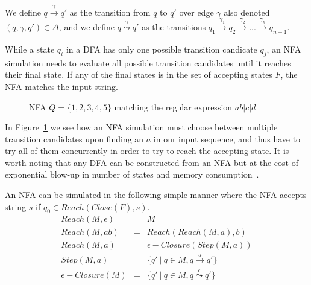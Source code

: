 \documentclass[12pt]{article}
\theoremstyle{definition}
\begin{document}
We define $q \xrightarrow{\gamma} q'$ as the transition from $q$ to $q'$ over edge $\gamma$ also denoted $(q, \gamma, q') \in \Delta$, and we define $q \overset{\gamma}{\leadsto} q'$ as the transitions $q_1 \xrightarrow{\gamma_1} q_{2} \xrightarrow{\gamma_{2}} ... \xrightarrow{\gamma_{n}} q_{n+1}$.

While a state $q_i$ in a DFA has only one possible transition candicate $q_j$, an NFA simulation needs to evaluate all possible transition candidates until it reaches their final state. If any of the final states is in the set of accepting states $F$, the NFA matches the input string.

\begin{figure}[H]
  \begin{center}

	
	\caption{NFA $Q = \{1, 2, 3, 4, 5\}$ matching the regular expression \underline{$ab|c|d$}}
	\label{nfa_simple}
  \end{center}
\end{figure}

In Figure~\ref{nfa_simple} we see how an NFA simulation must choose between multiple transition candidates upon finding an $a$ in our input sequence, and thus have to try all of them concurrently in order to try to reach the accepting state. It is worth noting that any DFA can be constructed from an NFA but at the cost of exponential blow-up in number of states and memory consumption~\cite{nfa-to-dfa}.

An NFA can be simulated in the following simple manner where the NFA accepts string $s$ if $q_0 \in Reach(Close(F), s)$.
\begin{eqnarray}
	Reach(M, \epsilon) & = & M \\
	Reach(M, ab) & = & Reach(Reach(M, a), b) \\
	Reach(M, a) & = & \epsilon-Closure(Step(M, a)) \\
	Step(M, a) & = & \{ q'\ |\ q \in M, q \xrightarrow{a} q' \} \\
	\epsilon-Closure(M) & = & \{ q'\ |\ q \in M, q \overset{\epsilon}{\leadsto} q' \}
\end{eqnarray}
\end{document}
